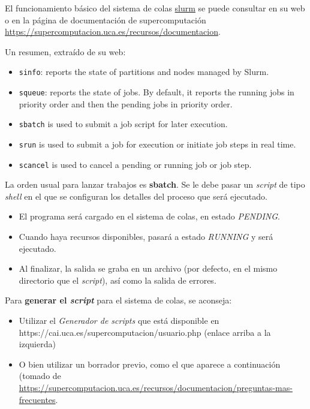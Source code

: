 El funcionamiento básico del sistema de colas
\href{https://slurm.schedmd.com/quickstart.html}{slurm} se puede consultar en su
web o en la página de documentación de supercomputación
\url{https://supercomputacion.uca.es/recursos/documentacion}.

Un resumen, extraído de su web:
\begin{itemize}
\item \texttt{sinfo}: reports the state of partitions and nodes
  managed by Slurm.
\item \texttt{squeue}: reports the state of jobs. By default, it
  reports the running jobs in priority order and then the pending jobs
  in priority order.
\item \texttt{sbatch} is used to submit a job script for later
  execution.
\item \texttt{srun} is used to submit a job for execution or
  initiate job steps in real time.
\item \texttt{scancel} is used to cancel a pending or running job or
  job step.
\end{itemize}

La orden usual para lanzar trabajos es \textbf{sbatch}. Se le debe
pasar un \textit{script} de tipo \textit{shell} en el que se
configuran los detalles del proceso que será ejecutado.
\begin{itemize}
\item El programa
será cargado en el sistema de colas, en estado \textit{PENDING}.
\item Cuando haya recursos disponibles, pasará a estado
  \textit{RUNNING} y será ejecutado.
\item Al finalizar, la salida se graba en un archivo (por defecto, en
  el mismo directorio que el \textit{script}), así como la salida de
  errores.
\end{itemize}
Para \textbf{generar el \textit{script}} para el sistema de colas, se aconseja:
\begin{itemize}
\item Utilizar el \textit{Generador de scripts} que está disponible en
https://cai.uca.es/supercomputacion/usuario.php (enlace arriba a la izquierda)
\item O bien utilizar un borrador previo, como el que aparece a continuación (tomado de \url{https://supercomputacion.uca.es/recursos/documentacion/preguntas-mas-frecuentes}.
\end{itemize}

